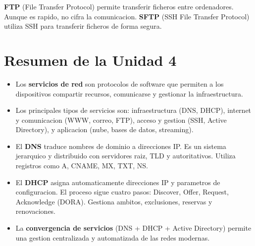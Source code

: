 \textbf{FTP} (File Transfer Protocol) permite transferir ficheros entre ordenadores.
Aunque es rapido, no cifra la comunicacion. \textbf{SFTP} (SSH File Transfer Protocol)
utiliza SSH para transferir ficheros de forma segura.


\section{Resumen de la Unidad 4}

\begin{itemize}
    \item Los \textbf{servicios de red} son protocolos de software que permiten a los
    dispositivos compartir recursos, comunicarse y gestionar la infraestructura.
    \item Los principales tipos de servicios son: infraestructura (DNS, DHCP),
    internet y comunicacion (WWW, correo, FTP), acceso y gestion (SSH, Active
    Directory), y aplicacion (nube, bases de datos, streaming).
    \item El \textbf{DNS} traduce nombres de dominio a direcciones IP. Es un sistema
    jerarquico y distribuido con servidores raiz, TLD y autoritativos. Utiliza
    registros como A, CNAME, MX, TXT, NS.
    \item El \textbf{DHCP} asigna automaticamente direcciones IP y parametros de
    configuracion. El proceso sigue cuatro pasos: Discover, Offer, Request,
    Acknowledge (DORA). Gestiona ambitos, exclusiones, reservas y renovaciones.
    \item La \textbf{convergencia de servicios} (DNS + DHCP + Active Directory) permite
    una gestion centralizada y automatizada de las redes modernas.
\end{itemize}
